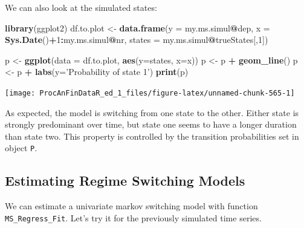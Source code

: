 \documentclass[11pt,]{book}
\newenvironment{Shaded}{\begin{snugshade}}{\end{snugshade}}
\newcommand{\KeywordTok}[1]{\textcolor[rgb]{0.27,0.27,0.27}{\textbf{#1}}}
\newcommand{\DataTypeTok}[1]{\textcolor[rgb]{0.27,0.27,0.27}{#1}}
\newcommand{\DecValTok}[1]{\textcolor[rgb]{0.06,0.06,0.06}{#1}}
\newcommand{\StringTok}[1]{\textcolor[rgb]{0.5,0.5,0.5}{#1}}
\newcommand{\OperatorTok}[1]{\textcolor[rgb]{0.81,0.36,0.00}{\textbf{#1}}}
\newcommand{\NormalTok}[1]{#1}
\begin{document}
We can also look at the simulated states:

\begin{Shaded}
\begin{Highlighting}[]
\KeywordTok{library}\NormalTok{(ggplot2)}
\NormalTok{df.to.plot <-}\StringTok{ }\KeywordTok{data.frame}\NormalTok{(}\DataTypeTok{y =}\NormalTok{ my.ms.simul}\OperatorTok{@}\NormalTok{dep, }
                         \DataTypeTok{x =} \KeywordTok{Sys.Date}\NormalTok{()}\OperatorTok{+}\DecValTok{1}\OperatorTok{:}\NormalTok{my.ms.simul}\OperatorTok{@}\NormalTok{nr,}
                         \DataTypeTok{states =}\NormalTok{ my.ms.simul}\OperatorTok{@}\NormalTok{trueStates[,}\DecValTok{1}\NormalTok{])}

\NormalTok{p <-}\StringTok{ }\KeywordTok{ggplot}\NormalTok{(}\DataTypeTok{data =}\NormalTok{ df.to.plot, }\KeywordTok{aes}\NormalTok{(}\DataTypeTok{y=}\NormalTok{states, }\DataTypeTok{x=}\NormalTok{x))}
\NormalTok{p <-}\StringTok{ }\NormalTok{p }\OperatorTok{+}\StringTok{ }\KeywordTok{geom_line}\NormalTok{()}
\NormalTok{p <-}\StringTok{ }\NormalTok{p }\OperatorTok{+}\StringTok{ }\KeywordTok{labs}\NormalTok{(}\DataTypeTok{y=}\StringTok{'Probability of state 1'}\NormalTok{)}
\KeywordTok{print}\NormalTok{(p)}
\end{Highlighting}
\end{Shaded}

\begin{center}\texttt{[image: ProcAnFinDataR\_ed\_1\_files/figure-latex/unnamed-chunk-565-1]} \end{center}

As expected, the model is switching from one state to the other. Either
state is strongly predominant over time, but state one seems to have a
longer duration than state two. This property is controlled by the
transition probabilities set in object \texttt{P}.

\subsection{Estimating Regime Switching
Models}\label{estimating-regime-switching-models}

We can estimate a univariate markov switching model with function
\texttt{MS\_Regress\_Fit}. Let's try it for the previously simulated
time series.
\end{document}
